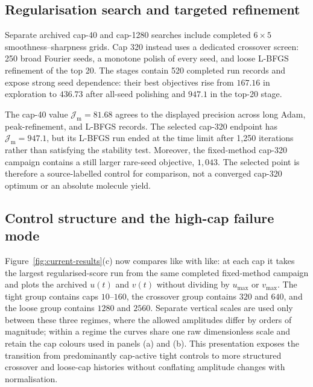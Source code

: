 \documentclass[9pt,a4paper,twocolumn,twoside]{rho-class/rho}
\newcommand{\Jmol}{\mathcal{J}_{\mathrm{m}}}
\newcommand{\ShowcaseFortyObjective}{81.68}%
\newcommand{\ShowcaseThreeTwentyObjective}{947.1}%
\newcommand{\ShowcaseBaselineThreeTwentyBest}{1,043}%
\begin{document}
    \subsection{Regularisation search and targeted refinement}

        Separate archived cap-40 and cap-1280 searches include completed
        $6\times5$ smoothness--sharpness grids. Cap 320 instead uses a dedicated
        crossover screen: 250 broad Fourier seeds, a monotone polish of every
        seed, and loose L-BFGS refinement of the top 20. The stages contain 520
        completed run records and expose strong seed dependence: their best
        objectives rise from $167.16$ in exploration to $436.73$ after
        all-seed polishing and $\ShowcaseThreeTwentyObjective$ in the top-20
        stage.

        The cap-40 value $\Jmol=\ShowcaseFortyObjective$ agrees to the displayed
        precision across long Adam, peak-refinement, and L-BFGS records. The
        selected cap-320 endpoint has
        $\Jmol=\ShowcaseThreeTwentyObjective$, but its L-BFGS run ended at the
        time limit after 1,250 iterations rather than satisfying the stability
        test. Moreover, the fixed-method cap-320 campaign contains a still
        larger rare-seed objective, $\ShowcaseBaselineThreeTwentyBest$. The
        selected point is therefore a source-labelled control for comparison,
        not a converged cap-320 optimum or an absolute molecule yield.

    \subsection{Control structure and the high-cap failure mode}

        Figure~\ref{fig:current-results}(c) now compares like with like: at each
        cap it takes the largest regularised-score run from the same completed
        fixed-method campaign and plots the archived $u(t)$ and $v(t)$ without
        dividing by $u_{\max}$ or $v_{\max}$. The tight group contains caps
        $10$--$160$, the crossover group contains $320$ and $640$, and the
        loose group contains $1280$ and $2560$. Separate vertical scales are
        used only between these three regimes, where the allowed amplitudes
        differ by orders of magnitude; within a regime the curves share one
        raw dimensionless scale and retain the cap colours used in panels (a)
        and (b). This presentation exposes the transition from predominantly
        cap-active tight controls to more structured crossover and loose-cap
        histories without conflating amplitude changes with normalisation.
\end{document}
